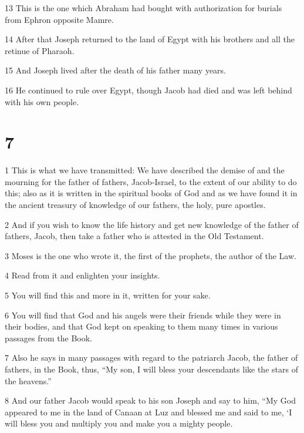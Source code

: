 \par 13 This is the one which Abraham had bought with authorization for burials from Ephron opposite Mamre. 

\par 14 After that Joseph returned to the land of Egypt with his brothers and all the retinue of Pharaoh. 

\par 15 And Joseph lived after the death of his father many years. 

\par 16 He continued to rule over Egypt, though Jacob had died and was left behind with his own people. 

\chapter{7}

\par 1 This is what we have transmitted: We have described the demise of and the mourning for the father of fathers, Jacob-Israel, to the extent of our ability to do this; also as it is written in the spiritual books of God and as we have found it in the ancient treasury of knowledge of our fathers, the holy, pure apostles. 

\par 2 And if you wish to know the life history and get new knowledge of the father of fathers, Jacob, then take a father who is attested in the Old Testament. 

\par 3 Moses is the one who wrote it, the first of the prophets, the author of the Law. 

\par 4 Read from it and enlighten your insights. 

\par 5 You will find this and more in it, written for your sake. 

\par 6 You will find that God and his angels were their friends while they were in their bodies, and that God kept on speaking to them many times in various passages from the Book.

\par 7 Also he says in many passages with regard to the patriarch Jacob, the father of fathers, in the Book, thus, “My son, I will bless your descendants like the stars of the heavens.” 

\par 8 And our father Jacob would speak to his son Joseph and say to him, “My God appeared to me in the land of Canaan at Luz and blessed me and said to me, ‘I will bless you and multiply you and make you a mighty people. 


